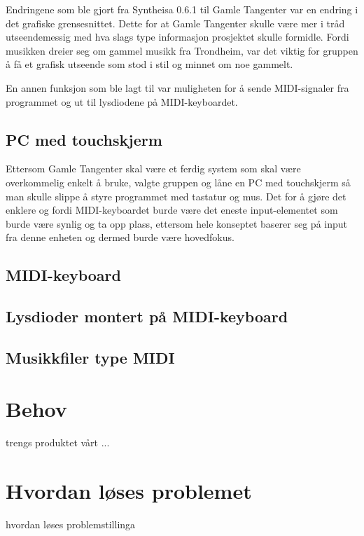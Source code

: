 Endringene som ble gjort fra Syntheisa 0.6.1 til Gamle Tangenter var en endring i det grafiske grensesnittet. Dette for at Gamle Tangenter skulle være mer i tråd utseendemessig med hva slags type informasjon prosjektet skulle formidle. Fordi musikken dreier seg om gammel musikk fra Trondheim, var det viktig for gruppen å få et grafisk utseende som stod i stil og minnet om noe gammelt.

En annen funksjon som ble lagt til var muligheten for å sende MIDI-signaler fra programmet og ut til lysdiodene på MIDI-keyboardet. 

\subsection{PC med touchskjerm}
Ettersom Gamle Tangenter skal være et ferdig system som skal være overkommelig enkelt å bruke, valgte gruppen og låne en PC med touchskjerm så man skulle slippe å styre programmet med tastatur og mus. Det for å gjøre det enklere og fordi MIDI-keyboardet burde være det eneste input-elementet som burde være synlig og ta opp plass, ettersom hele konseptet baserer seg på input fra denne enheten og dermed burde være hovedfokus. 

\subsection{MIDI-keyboard}


\subsection{Lysdioder montert på MIDI-keyboard}

\subsection{Musikkfiler type MIDI}

\section{Behov}
trengs produktet vårt ...
\section{Hvordan løses problemet}
hvordan løses problemstillinga
